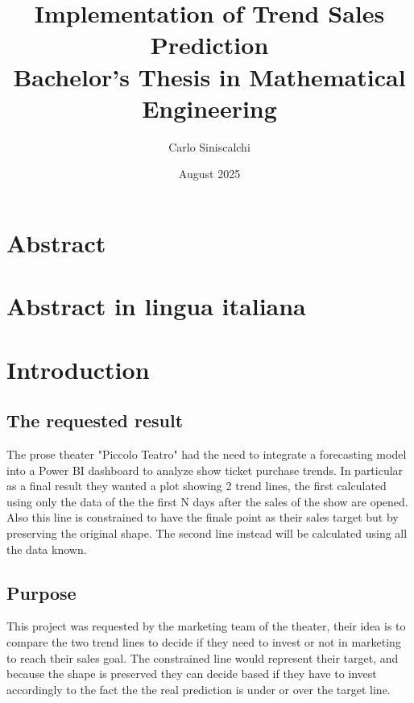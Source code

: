 \documentclass[a4paper,12pt]{report}  %
\title{\textbf{Implementation of Trend Sales Prediction} \\[1ex]
Bachelor's Thesis in Mathematical Engineering}
\author{Carlo Siniscalchi}
\date{August 2025}
\begin{document}
\begin{titlepage}
  \maketitle
  \thispagestyle{empty}      %
\end{titlepage}

\clearpage
\tableofcontents
\thispagestyle{empty}        %

\clearpage

\section*{Abstract}
\clearpage

\section*{Abstract in lingua italiana}
\clearpage


\section{Introduction}
\subsection{The requested result}
  The prose theater "Piccolo Teatro" had the need to integrate a forecasting model into a Power BI dashboard to analyze show ticket purchase trends.
  In particular as a final result they wanted a plot showing 2 trend lines, 
  the first calculated using only the data of the the first N days after the sales of the show are opened.
  Also this line is constrained to have the finale point as their sales target but by preserving the original shape.
  The second line instead will be calculated using all the data known.

\subsection{Purpose}
  This project was requested by the marketing team of the theater, their idea is to compare the two trend lines to decide 
  if they need to invest or not in marketing to reach their sales goal.
  The constrained line would represent their target, and because the shape is preserved they can decide based if they have to invest 
  accordingly to the fact the the real prediction is under or over the target line.
\end{document}

